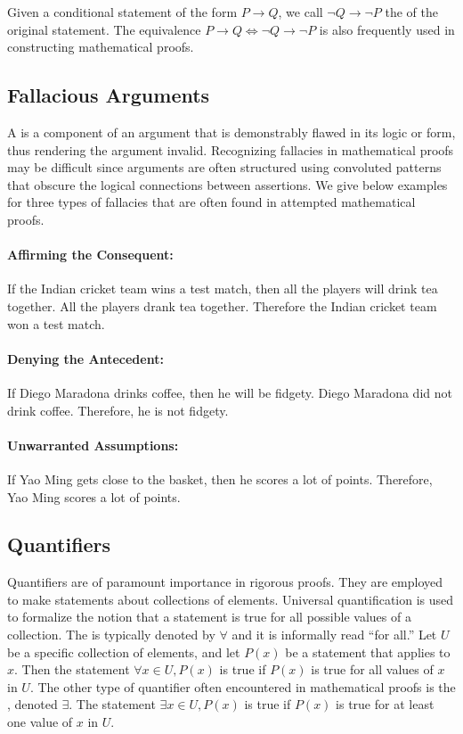 Given a conditional statement of the form $P \rightarrow Q$, we call $\neg Q \rightarrow \neg P$ the  of the original statement.
The equivalence $P \rightarrow Q \Leftrightarrow \neg Q \rightarrow \neg P$ is also frequently used in constructing mathematical proofs.
\subsection{Fallacious Arguments}

A  is a component of an argument that is demonstrably flawed in its logic or form, thus rendering the argument invalid.
Recognizing fallacies in mathematical proofs may be difficult since arguments are often structured using convoluted patterns that obscure the logical connections between assertions.
We give below examples for three types of fallacies that are often found in attempted mathematical proofs.

\paragraph{Affirming the Consequent:}
If the Indian cricket team wins a test match, then all the players will drink tea together.
All the players drank tea together.
Therefore the Indian cricket team won a test match.

\paragraph{Denying the Antecedent:}
If Diego Maradona drinks coffee, then he will be fidgety.
Diego Maradona did not drink coffee.
Therefore, he is not fidgety.

\paragraph{Unwarranted Assumptions:}
If Yao Ming gets close to the basket, then he scores a lot of points.
Therefore, Yao Ming scores a lot of points.


\subsection{Quantifiers}

Quantifiers are of paramount importance in rigorous proofs.
They are employed to make statements about collections of elements.
Universal quantification is used to formalize the notion that a statement is true for all possible values of a collection.
The  is typically denoted by $\forall$ and it is informally read ``for all.''
Let $U$ be a specific collection of elements, and let $P(x)$ be a statement that applies to $x$.
Then the statement $\forall x \in U, P(x)$ is true if $P(x)$ is true for all values of $x$ in $U$.
The other type of quantifier often encountered in mathematical proofs is the , denoted $\exists$.
The statement $\exists x \in U, P(x)$ is true if $P(x)$ is true for at least one value of $x$ in $U$.

